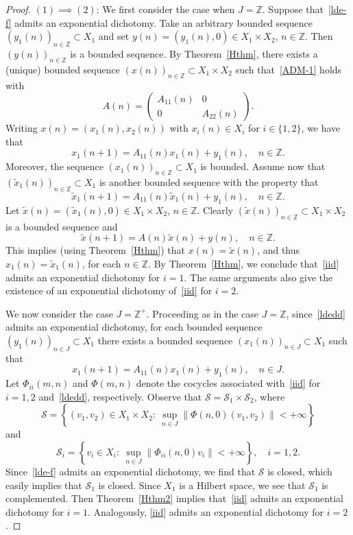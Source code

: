 \documentclass[11pt,reqno,a4paper]{amsart}
\theoremstyle{plain}
\numberwithin{equation}{section}
\theoremstyle{remark}
\def\Z{\mathbb{Z}}
\begin{document}
\begin{proof}

$(1)\implies (2)$:
We first consider the case when $J=\Z$. Suppose that~\eqref{lde-f} admits an exponential dichotomy. Take an arbitrary bounded sequence $(y_1(n))_{n\in \Z}\subset X_1$ and set $y(n)=(y_1(n), 0)\in X_1\times X_2$, $n\in \Z$. Then $(y(n))_{n\in \Z}$ is a bounded sequence. By Theorem~\ref{Hthm}, there exists a (unique) bounded sequence $(x(n))_{n\in \Z}\subset X_1\times X_2$ such that~\eqref{ADM-1} holds with
\[
A(n)=\begin{pmatrix}
A_{11}(n) & 0 \\
0 & A_{22}(n)
\end{pmatrix}.
\]
Writing $x(n)=(x_1(n), x_2(n))$ with $x_i(n)\in X_i$ for $i\in \{1, 2\}$, we have that 
\[
x_1(n+1)=A_{11}(n)x_1(n)+y_1(n), \quad n\in \Z.
\]
Moreover, the sequence $(x_1(n))_{n\in \Z}\subset X_1$ is bounded. Assume now that $(\tilde x_1(n))_{n\in \Z}\subset X_1$ is another bounded sequence with the property that 
\[
\tilde x_1(n+1)=A_{11}(n)\tilde x_1(n)+y_1(n), \quad n\in \Z.
\]
Let $\tilde x(n)=(\tilde x_1(n), 0)\in X_1\times X_2$, $n\in \Z$. Clearly $(\tilde x(n))_{n\in \Z}\subset X_1\times X_2$ is a bounded sequence and 
\[
\tilde x(n+1)=A(n)\tilde x(n)+y(n), \quad n\in \Z.
\]
This implies (using Theorem~\ref{Hthm}) that $x(n)=\tilde x(n)$, and thus $x_1(n)=\tilde x_1(n)$, for each $n\in \Z$. By Theorem~\ref{Hthm}, we conclude that~\eqref{iid} admits an exponential dichotomy for $i=1$. The same arguments also give the existence of an exponential dichotomy of~\eqref{iid} for $i=2$.

We now consider the case $J=\Z^+$. Proceeding as in the case $J=\Z$, since~\eqref{ldedd} admits an exponential dichotomy,  for each bounded sequence $(y_1(n))_{n\in J}\subset X_1$ there exists a bounded sequence $(x_1(n))_{n\in J}\subset X_1$ such that 
\[
x_1(n+1)=A_{11}(n)x_1(n)+y_1(n), \quad n\in J.
\]
Let $\Phi_{ii}(m, n)$ and $\Phi(m, n)$ denote the cocycles associated with~\eqref{iid} for $i=1, 2$ and~\eqref{ldedd}, respectively. Observe that $\mathcal S=\mathcal S_1\times \mathcal S_2$, where
\begin{equation}\label{mS}
\mathcal S=\left \{(v_1, v_2)\in X_1\times X_2: \ \sup_{n\in J}\|\Phi(n, 0)(v_1, v_2)\|<+\infty \right \}
\end{equation}
and 
\begin{equation}\label{Si}
\mathcal S_i=\left \{v_i\in X_i: \ \sup_{n\in J}\|\Phi_{ii}(n, 0)v_i\|<+\infty \right \}, \quad i=1, 2.
\end{equation}
Since~\eqref{lde-f} admits an exponential dichotomy, we find that $\mathcal S$ is closed, which easily implies that $\mathcal S_1$ is closed. Since $X_1$ is a Hilbert space, we see that $\mathcal S_1$ is complemented. 
Then Theorem~\ref{Hthm2} implies that~\eqref{iid} admits an exponential dichotomy for $i=1$. Analogously, \eqref{iid} admits an exponential dichotomy for $i=2$.


\end{proof}
\end{document}
